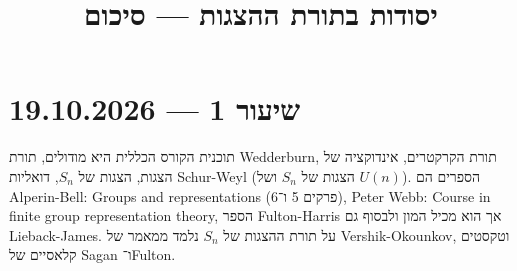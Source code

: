 
\title{יסודות בתורת ההצגות --- סיכום}
\setcounter{secnumdepth}{2}

\usepackage{fancyhdr}
\pagestyle{fancy}
\renewcommand{\headrulewidth}{0pt}


\maketitle
\maketitleprint[red]{}

\tableofcontents

\section{שיעור 1 --- 19.10.2026}
תוכנית הקורס הכללית היא מודולים, תורת Wedderburn, תורת הקרקטרים, אינדוקציה של הצגות, הצגות של $S_n$, דואליות Schur-Weyl (הצגות של $S_n$ ושל $U(n)$).
הספרים הם Alperin-Bell: Groups and representations (פרקים 5 ו־6), Peter Webb: Course in finite group representation theory, הספר Fulton-Harris אך הוא מכיל המון ולבסוף גם Lieback-James.
על תורת ההצגות של $S_n$ נלמד ממאמר של Vershik-Okounkov, וטקסטים קלאסיים של Sagan ו־Fulton.

